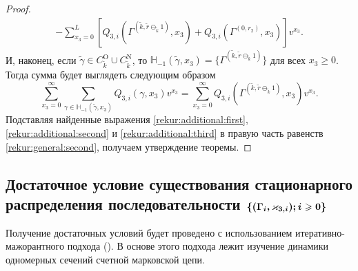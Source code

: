 \documentclass[a4paper,12pt,russian]{extarticle}
\newcommand{\MarkThree}{\{(\Gamma_i, \varkappa_{3,i}); \hm{} i \geqslant 0\}}
\begin{document}
\begin{proof}
\begin{multline}
-\sum_{x_3=0}^{L} \left[ Q_{3,i}(\Gamma^{(\tilde{k},\tilde{r}\ominus_{\tilde{k}} 1)},x_3) + Q_{3,i}(\Gamma^{(0,r_2)},x_3) \right] v^{x_3}.
\label{rekur:additional:second}
\end{multline}
И, наконец, если $\tilde{\gamma}\in C_{\tilde{k}}^{\mathrm{O}} \cup C_{\tilde{k}}^{\mathrm{N}}$, то ${\mathbb H}_{-1}(\tilde{\gamma},x_3) = \{\Gamma^{(\tilde{k},\tilde{r}\ominus_{\tilde{k}} 1)}\}$ для всех $x_3\geqslant 0$. Тогда сумма будет выглядеть следующим образом
\begin{equation}
\sum_{x_3=0}^{\infty} \sum_{\gamma \in {\mathbb H}_{-1}(\tilde{\gamma},x_3)} Q_{3,i}(\gamma,x_3) v^{x_3} = \sum_{x_3=0}^{\infty} Q_{3,i}(\Gamma^{(\tilde{k},\tilde{r}\ominus_{\tilde{k}} 1)},x_3) v^{x_3}.
\label{rekur:additional:third}
\end{equation}
Подставляя найденные выражения \eqref{rekur:additional:first}, \eqref{rekur:additional:second} и \eqref{rekur:additional:third} в правую часть равенств \eqref{rekur:general:second}, получаем утверждение теоремы.
\end{proof}

\subsection[Достаточное условие существования стационарного {распределения} последовательности $\boldsymbol{\MarkThree}$]%
{ Достаточное условие существования стационарного {распределения} последовательности $\boldsymbol{\MarkThree}$}
Получение достаточных условий будет проведено с использованием итеративно-мажорантного подхода (\cite{Fedotkin:1988,Fedotkin:1989}). В основе этого подхода лежит изучение динамики одномерных сечений счетной марковской цепи. 
\end{document}
